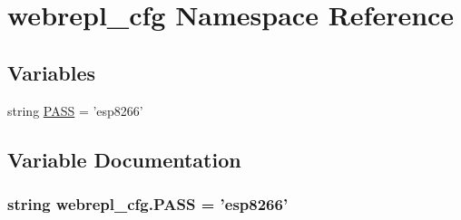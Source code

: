 \hypertarget{namespacewebrepl__cfg}{\section{webrepl\-\_\-cfg Namespace Reference}
\label{namespacewebrepl__cfg}
}
\subsection*{Variables}
\begin{DoxyCompactItemize}
\item 
string \hyperlink{namespacewebrepl__cfg_a333729090b320615decfcce5a4d5b305}{P\-A\-S\-S} = 'esp8266'
\end{DoxyCompactItemize}


\subsection{Variable Documentation}
\hypertarget{namespacewebrepl__cfg_a333729090b320615decfcce5a4d5b305}{
\subsubsection[{P\-A\-S\-S}]{\setlength{\rightskip}{0pt plus 5cm}string webrepl\-\_\-cfg.\-P\-A\-S\-S = 'esp8266'}}\label{namespacewebrepl__cfg_a333729090b320615decfcce5a4d5b305}
